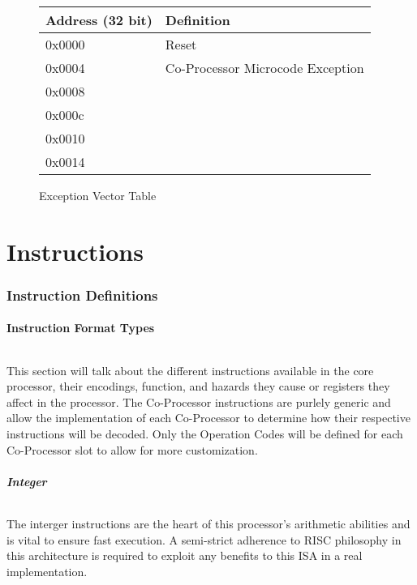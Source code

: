 \documentclass[letterpaper, 11pt]{article}
\begin{document}
\begin{figure}[!h]
	\begin{center}
		\begin{tabular}{|l|l|}
			\hline
			Address (32 bit) &  Definition\\ \hline
			0x0000 & Reset \\ 	\hline
			0x0004 & Co-Processor Microcode Exception \\ 	\hline
			0x0008 &  \\ 	\hline
			0x000c &  \\ 	\hline
			0x0010 &  \\ 	\hline
			0x0014 &  \\	\hline
		\end{tabular} 
		\caption{Exception Vector Table}
	\end{center}
	
\end{figure} 


\part{Instructions}
\section{Instruction Definitions}
\subsection{Instruction Format Types}
\paragraph{}This section will talk about the different instructions available in the core processor, their encodings, function, and hazards
they cause or registers they affect in the processor. The Co-Processor instructions are purlely generic and allow the implementation of
each Co-Processor to determine how their respective instructions will be decoded. Only the Operation Codes will be defined for each 
Co-Processor slot to allow for more customization.
\subsubsection{Integer}
\paragraph{}The interger instructions are the heart of this processor's arithmetic abilities and is vital to ensure fast execution. A semi-strict
adherence to RISC philosophy in this architecture is required to exploit any benefits to this ISA in a real implementation.
\end{document}
